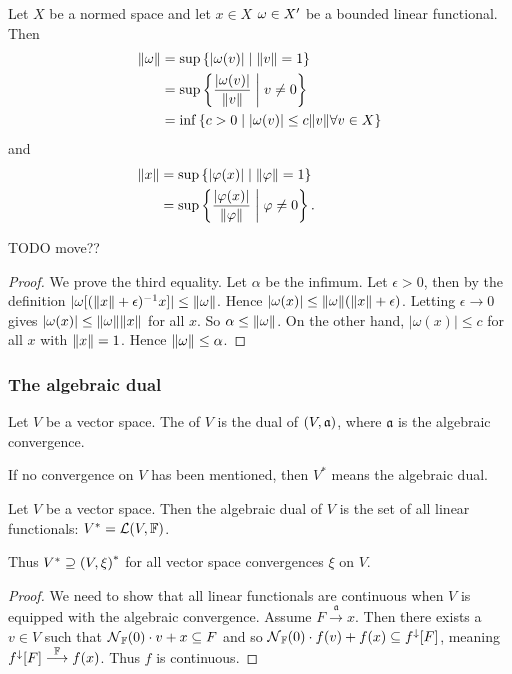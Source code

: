 \begin{lemma} Let $X$ be a normed space and
let $x\in X$ $\omega\in {X}^\prime$ be a bounded linear functional. Then
\begin{align*}
\lVert\omega\rVert &= \sup\left\{ |\omega(v)| \;\middle|\; \lVert v\rVert=1  \right\} \\
&= \sup\left\{ \frac{|\omega(v)|}{\lVert v\rVert} \;\middle|\; v\neq 0 \right\} \\
&= \inf\left\{ c>0 \;\middle|\; |\omega(v)|\leq c\lVert v\rVert\forall v\in X \right\}
\end{align*}
and
\begin{align*}
\norm{x} &= \sup\setbuilder{|\varphi(x)|}{ \norm{\varphi}=1} \qquad\qquad\quad\\ %
&= \sup\setbuilder{\frac{|\varphi(x)|}{\norm{\varphi}}}{\varphi\neq 0}.
\end{align*}
\end{lemma}
TODO move??
\begin{proof}
We prove the third equality. Let $\alpha$ be the infimum. Let $\epsilon>0$, then by the definition $|\omega[(\lVert x\rVert+\epsilon)^{-1}x]|\leq \lVert\omega\rVert$. Hence $|\omega(x)|\leq \lVert\omega\rVert(\lVert x\rVert+\epsilon)$. Letting $\epsilon\to 0$ gives $|\omega(x)|\leq \lVert\omega\rVert\lVert x\rVert$ for all $x$. So $\alpha\leq \lVert\omega\rVert$. On the other hand, $|\omega(x)|\leq c$ for all $x$ with $\lVert x\rVert=1$. Hence $\lVert\omega\rVert\leq \alpha$.
\end{proof}

\subsubsection{The algebraic dual}
\begin{definition}
Let $V$ be a vector space. The  of $V$ is the dual of $\left( V,\mathfrak{a} \right)$, where $\mathfrak{a}$ is the algebraic convergence.

If no convergence on $V$ has been mentioned, then $V^*$ means the algebraic dual.
\end{definition}

\begin{proposition} \label{algebraicDual}
Let $V$ be a vector space. Then the algebraic dual of $V$ is the set of all linear functionals: $V^* = \operatorname{\mathcal{L}}(V,\mathbb{F})$.

Thus $V^* \supseteq \left( V,\xi \right)^*$ for all vector space convergences $\xi$ on $V$.
\end{proposition}
\begin{proof}
We need to show that all linear functionals are continuous when $V$ is equipped with the algebraic convergence. Assume $F\overset{\mathfrak{a}}{\longrightarrow} x$. Then there exists a $v\in V$ such that $\operatorname{\mathcal{N}}_{\mathbb{F}}(0)\cdot v+x \subseteq F$ and so $\operatorname{\mathcal{N}}_{\mathbb{F}}(0)\cdot f(v)+f(x) \subseteq f^\downarrow[F]$, meaning $f^\downarrow[F] \overset{\mathbb{F}}{\longrightarrow} f(x)$. Thus $f$ is continuous.
\end{proof}


